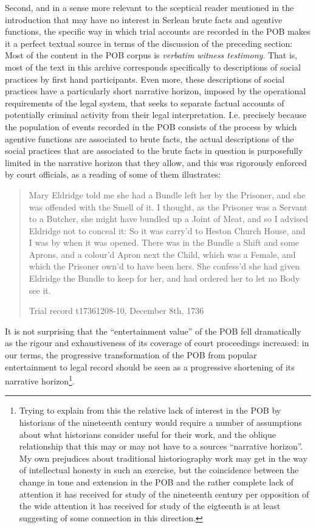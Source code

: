 Second, and in a sense more relevant to the sceptical reader mentioned in the introduction that may have no interest in Serlean brute facts and agentive functions, the specific way in which trial accounts are recorded in the POB makes it a perfect textual source in terms of the discussion of the preceding section:
Most of the content in the POB corpus is \emph{verbatim witness testimony}.
That is, most of the text in this archive corresponds specifically to descriptions of social practices by first hand participants.
Even more, these descriptions of social practices have a particularly short narrative horizon, imposed by the operational requirements of the legal system, that seeks to separate factual accounts of potentially criminal activity from their legal interpretation.
I.e. precisely because the population of events recorded in the POB consists of the process by which agentive functions are associated to brute facts, the actual descriptions of the social practices that are associated to the brute facts in question is purposefully limited in the narrative horizon that they allow, and this was rigorously enforced by court officials, as a reading of some of them illustrates:

\blockquote[Trial record t17361208-10, December 8th, 1736]{
    \label{quot:t17361208-10}
    Mary Eldridge told me she had a Bundle left her by the Prisoner, and she was offended with the Smell of it. I thought, as the Prisoner was a Servant to a Butcher, she might have bundled up a Joint of Meat, and so I advised Eldridge not to conceal it: So it was carry'd to Heston Church House, and I was by when it was opened. There was in the Bundle a Shift and some Aprons, and a colour'd Apron next the Child, which was a Female, and which the Prisoner own'd to have been hers. She confess'd she had given Eldridge the Bundle to keep for her, and had ordered her to let no Body see it.
}

It is not surprising that the ``entertainment value'' of the POB fell dramatically as the rigour and exhaustiveness of its coverage of court proceedings increased: in our terms, the progressive transformation of the POB from popular entertainment to legal record should be seen as a progressive shortening of its narrative horizon\footnote{
    \label{foot:historians}
    Trying to explain from this the relative lack of interest in the POB by historians of the nineteenth century would require a number of assumptions about what historians consider useful for their work, and the oblique relationship that this may or may not have to a sources ``narrative horizon''.
    My own prejudices about traditional historiography work may get in the way of intellectual honesty in such an exercise, but the coincidence between the change in tone and extension in the POB and the rather complete lack of attention it has received for study of the nineteenth century per opposition of the wide attention it has received for study of the eigteenth is at least suggesting of some connection in this direction.
}.

